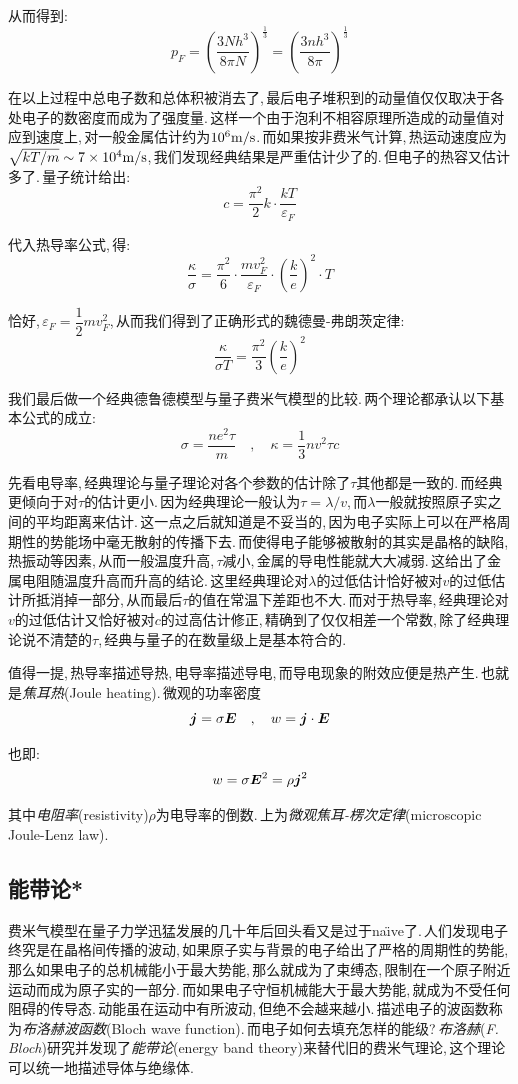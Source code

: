 从而得到:
\[p_F=(\frac{3Nh^3}{8\pi N})^{\frac{1}{3}}=(\frac{3nh^3}{8\pi})^{\frac{1}{3}}\]

在以上过程中总电子数和总体积被消去了,\,最后电子堆积到的动量值仅仅取决于各处电子的数密度而成为了强度量.\,这样一个由于泡利不相容原理所造成的动量值对应到速度上,\,对一般金属估计约为$10^6\rm m/s$.\,而如果按非费米气计算,\,热运动速度应为$\sqrt{kT/m}\sim 7\times 10^{4}\rm m/s$,\,我们发现经典结果是严重估计少了的.\,但电子的热容又估计多了.\,量子统计给出:
\[c=\frac{\pi^2}{2}k\cdot\frac{kT}{\varepsilon_F}\]

代入热导率公式,\,得:
\[\frac{\kappa}{\sigma}=\frac{\pi^2}{6}\cdot\frac{mv_F^2}{\varepsilon_F}\cdot(\frac{k}{e})^2\cdot T\]

恰好,\,$\varepsilon_F=\dfrac{1}{2}mv_F^2$,\,从而我们得到了正确形式的魏德曼-弗朗茨定律:
\[\frac{\kappa}{\sigma T}=\frac{\pi^2}{3}(\frac{k}{e})^2\]

我们最后做一个经典德鲁德模型与量子费米气模型的比较.\,两个理论都承认以下基本公式的成立:
\[\sigma=\frac{ne^2 \tau}{m}\quad ,\quad \kappa=\frac{1}{3}nv^2\tau c\]

先看电导率,\,经典理论与量子理论对各个参数的估计除了$\tau$其他都是一致的.\,而经典更倾向于对$\tau$的估计更小.\,因为经典理论一般认为$\tau=\lambda/v$,\,而$\lambda$一般就按照原子实之间的平均距离来估计.\,这一点之后就知道是不妥当的,\,因为电子实际上可以在严格周期性的势能场中毫无散射的传播下去.\,而使得电子能够被散射的其实是晶格的缺陷,\,热振动等因素,\,从而一般温度升高,\,$\tau$减小,\,金属的导电性能就大大减弱.\,这给出了金属电阻随温度升高而升高的结论.\,这里经典理论对$\lambda$的过低估计恰好被对$v$的过低估计所抵消掉一部分,\,从而最后$\tau$的值在常温下差距也不大.\,而对于热导率,\,经典理论对$v$的过低估计又恰好被对$c$的过高估计修正,\,精确到了仅仅相差一个常数,\,除了经典理论说不清楚的$\tau$,\,经典与量子的在数量级上是基本符合的.

值得一提,\,热导率描述导热,\,电导率描述导电,\,而导电现象的附效应便是热产生.\,也就是\emph{焦耳热}(Joule heating).\,微观的功率密度
\[\boldsymbol{j}=\sigma \boldsymbol{E}\quad ,\quad w=\boldsymbol{j}\cdot\boldsymbol{E}\]

也即:
\[w=\sigma \boldsymbol{E}^2=\rho \boldsymbol{j}^2\]

其中\emph{电阻率}(resistivity)$\rho$为电导率的倒数.\,上为\emph{微观焦耳-楞次定律}(microscopic Joule-Lenz law).

\subsection{能带论*}

费米气模型在量子力学迅猛发展的几十年后回头看又是过于na\"\i ve了.\,人们发现电子终究是在晶格间传播的波动,\,如果原子实与背景的电子给出了严格的周期性的势能,\,那么如果电子的总机械能小于最大势能,\,那么就成为了束缚态,\,限制在一个原子附近运动而成为原子实的一部分.\,而如果电子守恒机械能大于最大势能,\,就成为不受任何阻碍的传导态.\,动能虽在运动中有所波动,\,但绝不会越来越小.\,描述电子的波函数称为\emph{布洛赫波函数}(Bloch wave function).\,而电子如何去填充怎样的能级?\,\emph{布洛赫}({\it F. Bloch})研究并发现了\emph{能带论}(energy band theory)来替代旧的费米气理论,\,这个理论可以统一地描述导体与绝缘体.

